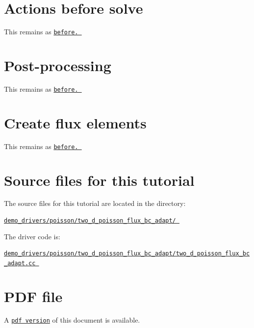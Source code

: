  

\hypertarget{index_actions_before}{}\section{Actions before solve}\label{index_actions_before}
This remains as \href{../../two_d_poisson_flux_bc2/html/index.html#actions_before}{\tt before. }



 

\hypertarget{index_doc}{}\section{Post-\/processing}\label{index_doc}
This remains as \href{../../two_d_poisson_flux_bc2/html/index.html#doc}{\tt before. }



 

\hypertarget{index_create_flux}{}\section{Create flux elements}\label{index_create_flux}
This remains as \href{../../two_d_poisson_flux_bc2/html/index.html}{\tt before. }



 

\hypertarget{index_sources}{}\section{Source files for this tutorial}\label{index_sources}

\begin{DoxyItemize}
\item The source files for this tutorial are located in the directory\+: \begin{center} \href{../../../../demo_drivers/poisson/two_d_poisson_flux_bc_adapt/}{\tt demo\+\_\+drivers/poisson/two\+\_\+d\+\_\+poisson\+\_\+flux\+\_\+bc\+\_\+adapt/ } \end{center} 
\item The driver code is\+: \begin{center} \href{../../../../demo_drivers/poisson/two_d_poisson_flux_bc_adapt/two_d_poisson_flux_bc_adapt.cc}{\tt demo\+\_\+drivers/poisson/two\+\_\+d\+\_\+poisson\+\_\+flux\+\_\+bc\+\_\+adapt/two\+\_\+d\+\_\+poisson\+\_\+flux\+\_\+bc\+\_\+adapt.\+cc } \end{center} 
\end{DoxyItemize}



 

 \hypertarget{index_pdf}{}\section{P\+D\+F file}\label{index_pdf}
A \href{../latex/refman.pdf}{\tt pdf version} of this document is available. 
